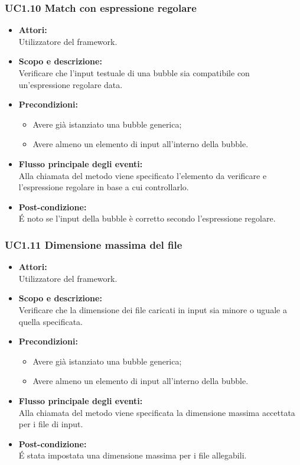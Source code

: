 \subsubsection{UC1.10 Match con espressione regolare} \label{UC1.10}

\begin{itemize}
	\item \textbf{Attori:}
	\\Utilizzatore del framework.
	\item \textbf{Scopo e descrizione:} 
	\\Verificare che l’input testuale di una bubble sia compatibile con un'espressione regolare data.
	\item \textbf{Precondizioni:}
	\begin{itemize}
		\item Avere già istanziato una bubble generica;
		\item Avere almeno un elemento di input all'interno della bubble.
	\end{itemize}
	\item \textbf{Flusso principale degli eventi:}
	\\Alla chiamata del metodo viene specificato l’elemento da verificare e l'espressione regolare in base a cui controllarlo.
	\item \textbf{Post-condizione:}
	\\É noto se l’input della bubble è corretto secondo l’espressione regolare.
\end{itemize}

\subsubsection{UC1.11 Dimensione massima del file} \label{UC1.11}

\begin{itemize}
	\item \textbf{Attori:}
	\\Utilizzatore del framework.
	\item \textbf{Scopo e descrizione:} 
	\\Verificare che la dimensione dei file caricati in input sia minore o uguale a quella specificata.
	\item \textbf{Precondizioni:}
	\begin{itemize}
		\item Avere già istanziato una bubble generica;
		\item Avere almeno un elemento di input all'interno della bubble.
	\end{itemize}
	\item \textbf{Flusso principale degli eventi:}
	\\Alla chiamata del metodo viene specificata la dimensione massima accettata per i file di input.
	\item \textbf{Post-condizione:}
	\\É stata impostata una dimensione massima per i file allegabili.
\end{itemize}

